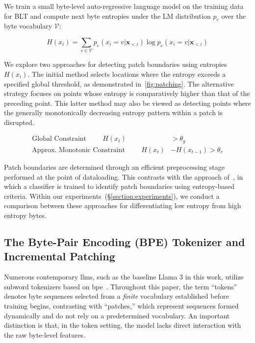 We train a small byte-level auto-regressive language model on the training data for {\textsc BLT} and compute next byte entropies under the LM distribution $p_{e}$ over the byte vocabulary $\mathcal{V}$:

\begin{equation}
H(x_i) = \sum_{v \in \mathcal{V}} p_{e}(x_i=v|\pmb{x}_{<i}) \log p_{e}(x_i=v|\pmb{x}_{<i})
\end{equation}

We explore two approaches for detecting patch boundaries using entropies $H(x_i)$. The initial method selects locations where the entropy exceeds a specified global threshold, as demonstrated in~\autoref{fig:patching}. The alternative strategy focuses on points whose entropy is comparatively higher than that of the preceding point. This latter method may also be viewed as detecting points where the generally monotonically decreasing entropy pattern within a patch is disrupted.

\begin{align*}
    \text{Global Constraint}\hspace{1cm}H(x_t)& > \theta_g\\
    \text{Approx. Monotonic Constraint}\hspace{1cm}H(x_t)& - H(x_{t-1}) > \theta_r
\end{align*}

Patch boundaries are determined through an efficient preprocessing stage performed at the point of dataloading. This contrasts with the approach of~\citet{nawrot-etal-2023-efficient}, in which a classifier is trained to identify patch boundaries using entropy-based criteria. Within our experiments~(\S\ref{section:experiments}), we conduct a comparison between these approaches for differentiating low entropy from high entropy bytes.

\subsection{The Byte-Pair Encoding (BPE) Tokenizer and Incremental Patching}
\label{section:incremental-patching}
\label{section:bpe-patch}

Numerous contemporary llms, such as the baseline Llama 3 in this work, utilize subword tokenizers based on bpe~\citep{gage1994new, sennrich-etal-2016-neural}. Throughout this paper, the term ``tokens'' denotes byte sequences selected from a \textit{finite} vocabulary established before training begins, contrasting with ``patches,'' which represent sequences formed dynamically and do not rely on a predetermined vocabulary. An important distinction is that, in the token setting, the model lacks direct interaction with the raw byte-level features.

